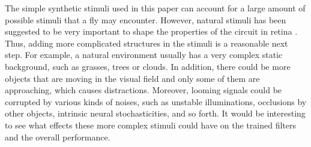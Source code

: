 \documentclass[pdftex,9pt,lineno]{elife}
\begin{document}
The simple synthetic stimuli used in this paper can account for a large amount of possible stimuli that a fly may encounter. However, natural stimuli has been suggested to be very important to shape the properties of the circuit in retina \citep{tanaka2019deep}. Thus, adding more complicated structures in the stimuli is a reasonable next step. For example, a natural environment usually has a very complex static background, such as grasses, trees or clouds. In addition, there could be more objects that are moving in the visual field and only some of them are approaching, which causes distractions. Moreover, looming signals could be corrupted by various kinds of noises, such as unstable illuminations, occlusions by other objects, intrinsic neural stochasticities, and so forth. It would be interesting to see what effects these more complex stimuli could have on the trained filters and the overall performance.














\end{document}
